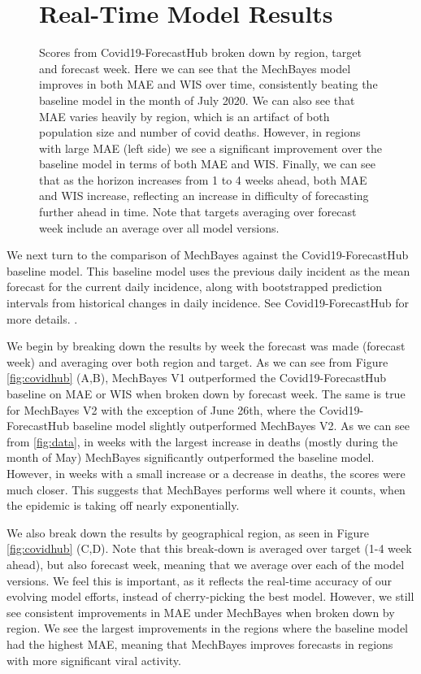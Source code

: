 \documentclass[11pt]{amsart}
\begin{document}
\begin{figure}
\section{Real-Time Model Results}

\caption{Scores from Covid19-ForecastHub broken down by region, target and forecast week. Here we can see that the MechBayes model improves in both MAE and WIS over time, consistently beating the baseline model in the month of July 2020. We can also see that MAE varies heavily by region, which is an artifact of both population size and number of covid deaths. However, in regions with large MAE (left side) we see a significant improvement over the baseline model in terms of both MAE and WIS. Finally, we can see that as the horizon increases from 1 to 4 weeks ahead, both MAE and WIS increase, reflecting an increase in difficulty of forecasting further ahead in time. Note that targets averaging over forecast week include an average over all model versions. }
\label{fig:covidhub_appendix}
\end{figure}



We next turn to the comparison of MechBayes against the Covid19-ForecastHub baseline model. This baseline model uses the previous daily incident as the mean forecast for the current daily incidence, along with  bootstrapped prediction intervals from historical changes in daily incidence. See Covid19-ForecastHub for more details. \cite{covidhub}. 

We begin by breaking down the results by week the forecast was made (forecast week) and averaging over both region and target. As we can see from Figure \ref{fig:covidhub} (A,B), MechBayes V1 outperformed the Covid19-ForecastHub baseline on MAE or WIS when broken down by forecast week. The same is true for MechBayes V2 with the exception of June 26th, where the Covid19-ForecastHub baseline model slightly outperformed MechBayes V2. As we can see from \ref{fig:data}, in weeks with the largest increase in deaths (mostly during the month of May) MechBayes significantly outperformed the baseline model. However, in weeks with a small increase or a decrease in deaths, the scores were much closer. This suggests that MechBayes performs well where it counts, when the epidemic is taking off nearly exponentially. 

We also break down the results by geographical region, as seen in Figure \ref{fig:covidhub} (C,D). Note that this break-down is averaged over target (1-4 week ahead), but also forecast week, meaning that we average over each of the model versions. We feel this is important, as it reflects the real-time accuracy of our evolving model efforts, instead of cherry-picking the best model. However, we still see consistent improvements in MAE under MechBayes when broken down by region. We see the largest improvements in the regions where the baseline model had the highest MAE, meaning that MechBayes improves forecasts in regions with more significant viral activity. 
\end{document}
